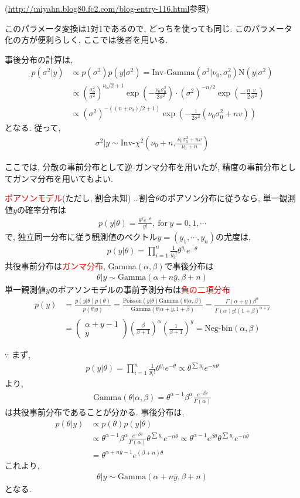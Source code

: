 \documentclass[11pt,a4pape,dvipdfmx]{jarticle}
\newcommand{\eqn}[1]{\begin{align*}#1\end{align*}}
\newcommand{\tcr}[1]{\textcolor{red}{#1}}
\begin{document}
(\url{http://miyahn.blog80.fc2.com/blog-entry-116.html}参照)

このパラメータ変換は1対1であるので, どっちを使っても同じ.
このパラメータ化の方が便利らしく, ここでは後者を用いる.

事後分布の計算は,
\eqn{p(\sigma^2|y)
&\propto p(\sigma^2)p(y|\sigma^2)=\text{Inv-Gamma}(\sigma^2|\nu_0,\sigma_0^2)\text{N}(y|\sigma^2)\\
&\propto \left(\frac{\sigma_0^2}{\sigma^2}\right)^{\nu_0/2+1} \exp\left(-\frac{\nu_0\sigma_0^2}{2\sigma^2}\right)\cdot (\sigma^2)^{-n/2}\exp \left(-\frac{n}{2}\frac{v}{\sigma^2}\right)\\
&\propto (\sigma^2)^{-((n+\nu_0)/2+1)} \exp\left(-\frac{1}{2\sigma^2} (\nu_0\sigma_0^2+nv)\right)}
となる.
従って,
\eqn{\sigma^2|y\sim \text{Inv-}\chi^2\left(\nu_0+n,\frac{\nu_0\sigma_0^2+nv}{\nu_0+n}\right)}

ここでは, 分散の事前分布として逆-ガンマ分布を用いたが, 精度の事前分布としてガンマ分布を用いてもよい.

\begin{itembox}[l]{\tcr{ポアソンモデル}(ただし, 割合未知)}
…割合$\theta$のポアソン分布に従うなら, 単一観測値$y$の確率分布は
\eqn{p(y|\theta)=\frac{\theta^ye^{-\theta}}{y!},\ \text{for}\ y=0,1,\cdots}
で, 独立同一分布に従う観測値のベクトル$y=(y_1,\cdots,y_n)$の尤度は,
\eqn{p(y|\theta)=\prod_{i=1}^n\frac{1}{y_i!}\theta^{y_i}e^{-\theta}}
共役事前分布は\tcr{ガンマ分布}, Gamma$(\alpha,\beta)$で事後分布は
\eqn{\theta|y\sim \text{Gamma}(\alpha+n\bar{y},\beta+n)}
単一観測値$y$のポアソンモデルの事前予測分布は\tcr{負の二項分布}
\eqn{p(y)&=\tfrac{p(y|\theta)p(\theta)}{p(\theta|y)}=\tfrac{\text{Poisson}(y|\theta)\text{Gamma}(\theta|\alpha,\beta)}{\text{Gamma}(\theta|\alpha+y,1+\beta)}=\tfrac{\Gamma(\alpha+y)\beta^{\alpha}}{\Gamma(\alpha)y!(1+\beta)^{\alpha+y}}\\
&=\left(\begin{array}{c}\alpha+y-1\\y\end{array}\right) \left(\frac{\beta}{\beta+1}\right)^{\alpha}\left(\frac{1}{\beta+1}\right)^y=\text{Neg-bin}(\alpha,\beta)}
\end{itembox}

$\because$
まず,
\eqn{p(y|\theta)=\prod_{i=1}^n\frac{1}{y_i!}\theta^{y_i}e^{-\theta}\propto\theta^{\sum y_i} e^{-n\theta}}
より,
\eqn{\text{Gamma}(\theta|\alpha,\beta)=\theta^{\alpha-1}\beta^{\alpha}\frac{e^{-\beta\theta}}{\Gamma(\alpha)}}
は共役事前分布であることが分かる.
事後分布は,
\eqn{p(\theta|y)
&\propto p(\theta)p(y|\theta)\\
&\propto \theta^{\alpha-1}\beta^{\alpha}\frac{e^{-\beta\theta}}{\Gamma(\alpha)}\theta^{\sum y_i} e^{-n\theta}\propto \theta^{\alpha-1}e^{\beta\theta}\theta^{\sum y_i} e^{-n\theta}\\
&=\theta^{\alpha+n\bar{y}-1}e^{(\beta+n)\theta}}
これより,
\eqn{\theta|y\sim \text{Gamma}(\alpha+n\bar{y},\beta+n)}
となる.
\end{document}
